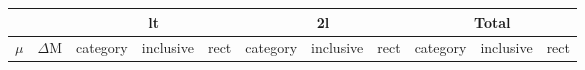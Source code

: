 \documentclass[12pt,A4paper]{article}
\begin{document}
\begin{table}[]
\hspace*{-2cm}
\begin{tabular}{lllllllllll}
\cline{3-11}
                                             & \multicolumn{1}{l|}{}       & \multicolumn{3}{c|}{lt}                                        & \multicolumn{3}{c|}{2l}                                        & \multicolumn{3}{c|}{Total}                                     \\ \hline 
\multicolumn{1}{|l|}{$\mu$}                    & \multicolumn{1}{l|}{$\Delta\mathrm{M}$}     & \multicolumn{1}{l|}{category} & \multicolumn{1}{l|}{inclusive} & \multicolumn{1}{l|}{rect} & \multicolumn{1}{l|}{category} & \multicolumn{1}{l|}{inclusive} & \multicolumn{1}{l|}{rect} & \multicolumn{1}{l|}{category} & \multicolumn{1}{l|}{inclusive} & \multicolumn{1}{l|}{rect} \\ \hline


\end{tabular}
\end{table}
\end{document}
